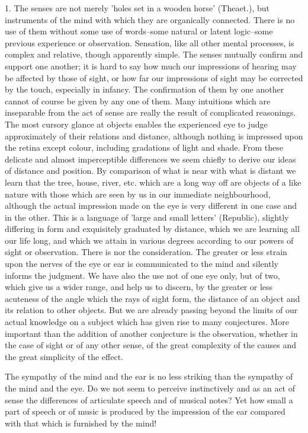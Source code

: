 1. The senses are not merely 'holes set in a wooden horse' (Theaet.),
but instruments of the mind with which they are organically connected.
There is no use of them without some use of words--some natural or
latent logic--some previous experience or observation. Sensation, like
all other mental processes, is complex and relative, though apparently
simple. The senses mutually confirm and support one another; it is hard
to say how much our impressions of hearing may be affected by those
of sight, or how far our impressions of sight may be corrected by the
touch, especially in infancy. The confirmation of them by one another
cannot of course be given by any one of them. Many intuitions which are
inseparable from the act of sense are really the result of complicated
reasonings. The most cursory glance at objects enables the experienced
eye to judge approximately of their relations and distance, although
nothing is impressed upon the retina except colour, including gradations
of light and shade. From these delicate and almost imperceptible
differences we seem chiefly to derive our ideas of distance and
position. By comparison of what is near with what is distant we learn
that the tree, house, river, etc. which are a long way off are objects
of a like nature with those which are seen by us in our immediate
neighbourhood, although the actual impression made on the eye is very
different in one case and in the other. This is a language of 'large and
small letters' (Republic), slightly differing in form and exquisitely
graduated by distance, which we are learning all our life long, and
which we attain in various degrees according to our powers of sight or
observation. There is nor the consideration. The greater or less strain
upon the nerves of the eye or ear is communicated to the mind and
silently informs the judgment. We have also the use not of one eye only,
but of two, which give us a wider range, and help us to discern, by the
greater or less acuteness of the angle which the rays of sight form,
the distance of an object and its relation to other objects. But we are
already passing beyond the limits of our actual knowledge on a subject
which has given rise to many conjectures. More important than the
addition of another conjecture is the observation, whether in the case
of sight or of any other sense, of the great complexity of the causes
and the great simplicity of the effect.

The sympathy of the mind and the ear is no less striking than
the sympathy of the mind and the eye. Do we not seem to perceive
instinctively and as an act of sense the differences of articulate
speech and of musical notes? Yet how small a part of speech or of music
is produced by the impression of the ear compared with that which is
furnished by the mind!


